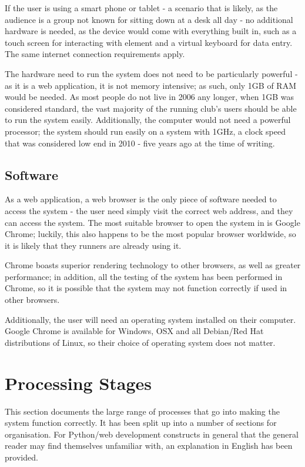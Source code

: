 \documentclass{article}[12pt,a4paper]
\begin{document}
If the user is using a smart phone or tablet - a scenario that is likely, as the audience is a group not known for sitting down at a desk all day - no additional hardware is needed, as the device would come with everything built in, such as a touch screen for interacting with element and a virtual keyboard for data entry. The same internet connection requirements apply.

The hardware need to run the system does not need to be particularly powerful - as it is a web application, it is not memory intensive; as such, only 1GB of RAM would be needed. As most people do not live in 2006 any longer, when 1GB was considered standard, the vast majority of the running club's users should be able to run the system easily. Additionally, the computer would not need a powerful processor; the system should run easily on a system with 1GHz, a clock speed that was considered low end in 2010 - five years ago at the time of writing. 

\subsection{Software}
As a web application, a web browser is the only piece of software needed to access the system - the user need simply visit the correct web address, and they can access the system. The most suitable browser to open the system in is Google Chrome; luckily, this also happens to be the most popular browser worldwide, so it is likely that they runners are already using it.

 Chrome boasts superior rendering technology to other browsers, as well as greater performance; in addition, all the testing of the system has been performed in Chrome, so it is possible that the system may not function correctly if used in other browsers. 

 Additionally, the user will need an operating system installed on their computer. Google Chrome is available for Windows, OSX and all Debian/Red Hat distributions of Linux, so their choice of operating system does not matter.

\section{Processing Stages}
This section documents the large range of processes that go into making the system function correctly. It has been split up into a number of sections for organisation. For Python/web development constructs in general that the general reader may find themselves unfamiliar with, an explanation in English has been provided.
\end{document}
